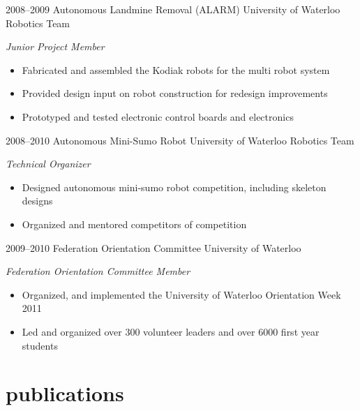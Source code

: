 \documentclass[stdletter]{friggeri-cv} %
\begin{document}
\begin{entrylist}
    \entry
    {2008--2009}
    {Autonomous Landmine Removal (ALARM)}
    {University of Waterloo Robotics Team}
    {\emph{Junior Project Member}
    \begin{itemize}
        \item Fabricated and assembled the Kodiak robots for the multi robot system 
        \item Provided design input on robot construction for redesign improvements
        \item Prototyped and tested electronic control boards and electronics
    \end{itemize} 
    }

    \entry
    {2008--2010}
    {Autonomous Mini-Sumo Robot}
    {University of Waterloo Robotics Team}
    {\emph{Technical Organizer}
    \begin{itemize}
        \item Designed autonomous mini-sumo robot competition, including skeleton designs
        \item Organized and mentored competitors of competition
    \end{itemize} 
    }

    \entry
    {2009--2010}
    {Federation Orientation Committee}
    {University of Waterloo}
    {\emph{Federation Orientation Committee Member}
    \begin{itemize}
        \item Organized, and implemented the University of Waterloo Orientation Week 2011
        \item Led and organized over 300 volunteer leaders and over 6000 first year students
    \end{itemize} 
    }
\end{entrylist}



\vspace{-3mm}
\section{publications}

\vspace{-2mm}
\end{document}
